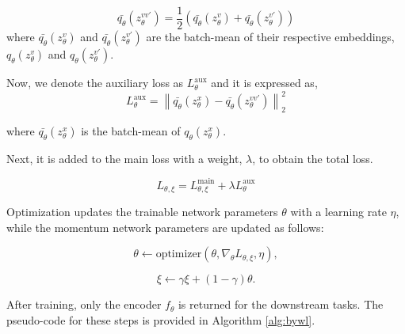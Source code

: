 \begin{equation}
\bar{q_{\theta}}(z_{\theta }^{vv'}) =  \frac{1}{2}\left ( \bar{q_{\theta}}(z_{\theta}^{v}) + \bar{q_{\theta}}(z_{\theta}^{v'}) \right )
\end{equation}
where $\bar{q_{\theta}}(z_{\theta}^{v})$ and $\bar{q_{\theta}}(z_{\theta}^{v'})$ are the batch-mean of their respective embeddings, $q_{\theta}(z_{\theta}^{v})$ and $q_{\theta}(z_{\theta}^{v'})$.

Now, we denote the auxiliary loss as $L_{\theta}^{\text{aux}}$ and it is expressed as,
\begin{equation}
L_{\theta}^{\text{aux}} = \left \| \bar{q_{\theta}}(z_{\theta}^{x}) - \bar{q_{\theta}}(z_{\theta}^{vv'})\right \|_{2}^{2}
\end{equation}

where $\bar{q_{\theta}}(z_{\theta}^{x})$ is the batch-mean of ${q_{\theta}}(z_{\theta}^{x})$.


Next, it is added to the main loss with a weight, $\lambda$, to obtain the total loss.

\begin{equation}
L_{\theta, \xi} = L_{\theta, \xi}^{\text{main}} + \lambda L_{\theta}^{\text{aux}}
\end{equation}


Optimization updates the trainable network parameters $\theta$ with a learning rate $\eta$, while the momentum network parameters are updated as follows:

\begin{equation}
\theta \leftarrow \text{optimizer}(\theta, \nabla_{\theta} L_{\theta, \xi}, \eta),
\end{equation}

\begin{equation}
\xi \leftarrow \gamma \xi + (1 - \gamma) \theta.
\end{equation}

After training, only the encoder $f_{\theta}$ is returned for the downstream tasks. The pseudo-code for these steps is provided in Algorithm \ref{alg:bywl}.


